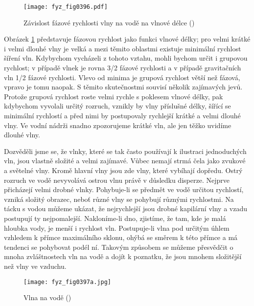   \begin{figure}[ht!] %
    \centering
    \texttt{[image: fyz\_fig0396.pdf]}
    \caption{Závislost fázové rychlosti vlny na vodě na vlnové délce
             (\cite[s.~697]{Feynman01})}
    \label{fyz:fig0396}
  \end{figure}
  Obrázek \ref{fyz:fig0396} představuje fázovou rychlost jako funkci vlnové délky; pro velmi krátké 
  i velmi dlouhé vlny je velká a mezi těmito oblastmi existuje minimální rychlost šíření vln. 
  Kdybychom vycházeli z tohoto vztahu, mohli bychom určit i grupovou rychlost; v případě vlnek je 
  rovna \num{3/2} fázové rychlosti a v případě gravitačních vln \num{1/2} fázové rychlosti. Vlevo 
  od minima je grupová rychlost větší  než fázová, vpravo je tomu naopak. S těmito skutečnostmi 
  souvisí několik zajímavých jevů. Protože grupová rychlost roste velmi rychle s poklesem vlnové 
  délky, pak kdybychom vyvolali určitý rozruch, vznikly by vlny příslušné délky, šířící se 
  minimální rychlostí a před nimi by postupovaly rychlejší krátké a velmi dlouhé vlny. Ve vodní 
  nádrži snadno zpozorujeme krátké vln, ale jen těžko uvidíme dlouhé vlny. 
  
  Dozvěděli jsme se, že vlnky, které se tak často používají k ilustraci jednoduchých vln, jsou 
  vlastně složité a velmi zajímavé. Vůbec nemají strmá čela jako zvukové a světelné vlny. Kromě 
  hlavní vlny jsou zde vlny, které vybíhají dopředu. Ostrý rozruch ve vodě nevyvolává ostrou vlnu 
  právě v důsledku disperze. Nejprve přicházejí velmi drobné vlnky. Pohybuje-li se předmět ve vodě 
  určitou rychlostí, vzniká složitý obrazec, neboť různé vlny se pohybují různými rychlostmi. Na 
  tácku s vodou můžeme ukázat, že nejrychlejší jsou drobné kapilární vlny a vzadu postupují ty 
  nejpomalejší. Nakloníme-li dno, zjistíme, že tam, kde je malá hloubka vody, je menší i rychlost 
  vln. Postupuje-li vlna pod určitým úhlem vzhledem k přímce maximálního sklonu, ohýbá se směrem k 
  této přímce a má tendenci se pohybovat podél ní. Takovým způsobem se můžeme přesvědčit o mnoha 
  zvláštnostech vln na vodě a dojít k poznatku, že jsou mnohem složitější než vlny ve vzduchu. 


  \begin{figure}[ht!] %
    \centering
    \texttt{[image: fyz\_fig0397a.jpg]}
    \caption{Vlna na vodě
             (\cite[s.~697]{Feynman01})}
    \label{fyz:fig0397}
  \end{figure}
  
